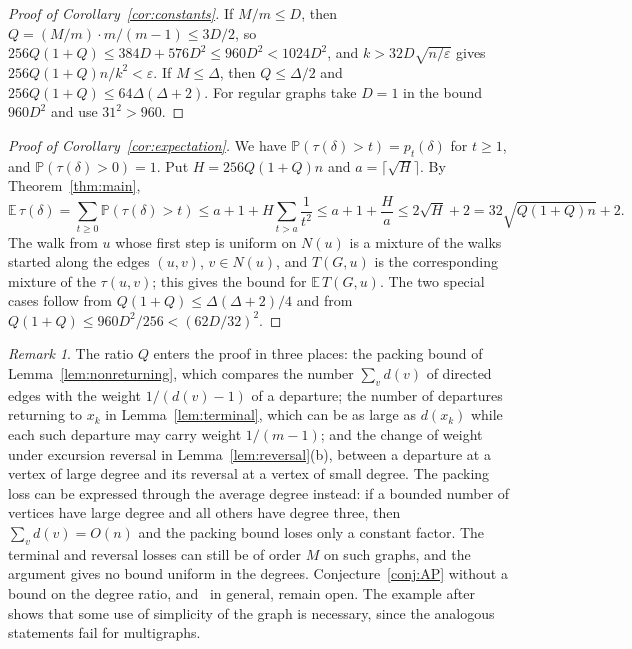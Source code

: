 \documentclass[11pt]{amsart}
\theoremstyle{remark}
\newtheorem{remark}[theorem]{Remark}
\newcommand{\PP}{\mathbb{P}}
\newcommand{\E}{\mathbb{E}}
\begin{document}
\begin{proof}[Proof of Corollary~\ref{cor:constants}]
If $M/m\le D$, then $Q=(M/m)\cdot m/(m-1)\le3D/2$, so $256Q(1+Q)\le384D+576D^2\le960D^2<1024D^2$, and
$k>32D\sqrt{n/\varepsilon}$ gives $256Q(1+Q)n/k^2<\varepsilon$. If $M\le\Delta$, then $Q\le\Delta/2$ and
$256Q(1+Q)\le64\Delta(\Delta+2)$. For regular graphs take $D=1$ in the bound $960D^2$ and use $31^2>960$.
\end{proof}

\begin{proof}[Proof of Corollary~\ref{cor:expectation}]
We have $\PP(\tau(\delta)>t)=p_t(\delta)$ for $t\ge1$, and $\PP(\tau(\delta)>0)=1$. Put $H=256Q(1+Q)n$ and
$a=\lceil\sqrt H\rceil$. By Theorem~\ref{thm:main},
\[
\E\,\tau(\delta)=\sum_{t\ge0}\PP(\tau(\delta)>t)\le a+1+H\sum_{t>a}\frac1{t^2}\le a+1+\frac Ha\le2\sqrt H+2
=32\sqrt{Q(1+Q)n}+2.
\]
The walk from $u$ whose first step is uniform on $N(u)$ is a mixture of the walks started along the edges $(u,v)$,
$v\in N(u)$, and $T(G,u)$ is the corresponding mixture of the $\tau(u,v)$; this gives the bound for $\E\,T(G,u)$. The
two special cases follow from $Q(1+Q)\le\Delta(\Delta+2)/4$ and from $Q(1+Q)\le960D^2/256<(62D/32)^2$.
\end{proof}

\begin{remark}\label{rem:ratio}
The ratio $Q$ enters the proof in three places: the packing bound of Lemma~\ref{lem:nonreturning}, which compares the
number $\sum_vd(v)$ of directed edges with the weight $1/(d(v)-1)$ of a departure; the number of departures returning to
$x_k$ in Lemma~\ref{lem:terminal}, which can be as large as $d(x_k)$ while each such departure may carry weight
$1/(m-1)$; and the change of weight under excursion reversal in Lemma~\ref{lem:reversal}(b), between a departure at a
vertex of large degree and its reversal at a vertex of small degree. The packing loss can be expressed through the
average degree instead: if a bounded number of vertices have large degree and all others have degree three, then
$\sum_vd(v)=O(n)$ and the packing bound loses only a constant factor. The terminal and reversal losses can still be
of order $M$ on such graphs, and the argument gives no bound uniform in the degrees.
Conjecture~\ref{conj:AP} without a bound on the degree ratio, and~\cite[Question~4]{BGJ26} in general, remain open.
The example after~\cite[Question~4]{BGJ26} shows that some use of simplicity of the graph is necessary, since the
analogous statements fail for multigraphs.
\end{remark}
\end{document}
